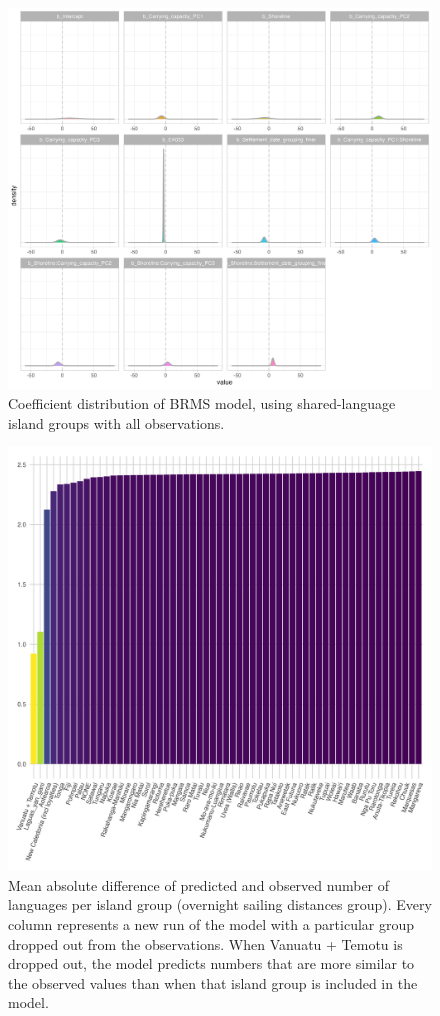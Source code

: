\documentclass[a4paper,10pt]{article} %
\begin{document}
\begin{figure}[ht]
\includegraphics[width=15cm]{brms_medium_group_full_effect_ridge_panels_plot.png}
\caption{Coefficient distribution of BRMS model, using shared-language island groups with all observations.}
\label{brms_medium_group_full_effect_ridge_panels}
\end{figure}

\begin{figure}[ht]
\includegraphics[width=15cm]{brms_Marck_dropped_out_plot_diff.png}
\caption{Mean absolute difference of predicted and observed number of languages per island group (overnight sailing distances group). Every column represents a new run of the model with a particular group dropped out from the observations. When Vanuatu + Temotu is dropped out, the model predicts numbers that are more similar to the observed values than when that island group is included in the model.}
\label{brms_Marck_dropped_out_plot_diff}
\end{figure}
\end{document}
